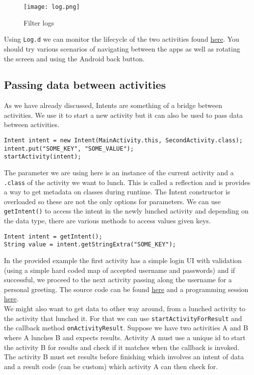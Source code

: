 \begin{figure}[H]
\centering
\texttt{[image: log.png]}
\caption{Filter logs}
\label{fig:logfilt}
\end{figure}

Using \texttt{Log.d} we can monitor the lifecycle of the two activities found \href{https://github.com/JonSteinn/AndroidDevelopment/tree/master/examples/lab3/lifecycle}{here}. You should try various scenarios of navigating between the apps as well as rotating the screen and using the Android back button.

\subsection{Passing data between activities}
As we have already discussed, Intents are something of a bridge between activities. We use it to start a new activity but it can also be used to pass data between activities.

\begin{lstlisting}[style=A_Java]
Intent intent = new Intent(MainActivity.this, SecondActivity.class);
intent.put("SOME_KEY", "SOME_VALUE");
startActivity(intent);
\end{lstlisting}

The parameter we are using here is an instance of the current activity and a \texttt{.class} of the activity we want to lunch. This is called a reflection and is provides a way to get metadata on classes during runtime. The Intent constructor is overloaded so these are not the only options for parameters. We can use \texttt{getIntent()} to access the intent in the newly lunched activity and depending on the data type, there are various methods to access values given keys.

\begin{lstlisting}[style=A_Java]
Intent intent = getIntent();
String value = intent.getStringExtra("SOME_KEY");
\end{lstlisting}

In the provided example the first activity has a simple login UI with validation (using a simple hard coded map of accepted username and passwords) and if successful, we proceed to the next activity passing along the username for a personal greeting. The source code can be found \href{https://github.com/JonSteinn/AndroidDevelopment/tree/master/examples/lab3/login}{here} and a programming session \href{TODO}{here}.\\

We might also want to get data to other way around, from a lunched activity to the activity that lunched it. For that we can use \texttt{startActivityForResult} and the callback method \texttt{onActivityResult}. Suppose we have two activities A and B where A lunches B and expects results. Activity A must use a unique id to start the activity B for results and check if it matches when the callback is invoked. The activity B must set results before finishing which involves an intent of data and a result code (can be custom) which activity A can then check for.\\

